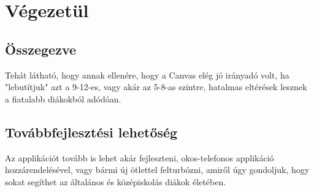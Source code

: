 \chapter{Végezetül}\label{ch:VEGEZETUL}
\section{Összegezve}\label{sec:VEGEZETUL:ossz}
Tehát látható, hogy annak ellenére, hogy a Canvas elég jó irányadó volt, ha "lebutítjuk" azt a 9-12-es, vagy akár az 5-8-as szintre, hatalmas eltérések lesznek a fiatalabb diákokból adódóan.
\section{Továbbfejlesztési lehetőség}\label{sec:VEGEZETUL:tovabb}
Az applikációt tovább is lehet akár fejleszteni, okos-telefonos applikáció hozzárendelésével, vagy bármi új ötlettel felturbózni, amiről úgy gondoljuk, hogy sokat segíthet az általános és középiskolás diákok életében.
